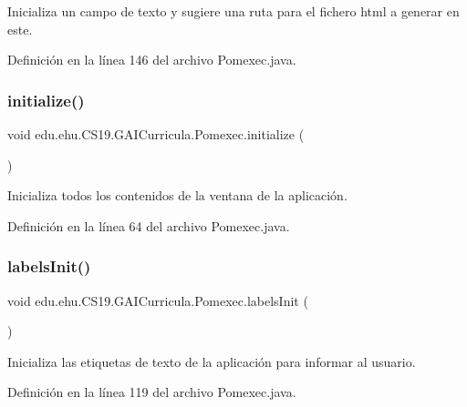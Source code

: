 Inicializa un campo de texto y sugiere una ruta para el fichero html a generar en este. 



Definición en la línea 146 del archivo Pomexec.\+java.

\mbox{\label{a00028_ab89003495509c2f11da18c9675828571}} 
\subsubsection{\texorpdfstring{initialize()}{initialize()}}
{\footnotesize\ttfamily void edu.\+ehu.\+C\+S19.\+G\+A\+I\+Curricula.\+Pomexec.\+initialize (\begin{DoxyParamCaption}{ }\end{DoxyParamCaption})\hspace{0.3cm}{\ttfamily [private]}}



Inicializa todos los contenidos de la ventana de la aplicación. 



Definición en la línea 64 del archivo Pomexec.\+java.

\mbox{\label{a00028_ab5c03aee261eda106376a3111cadaa0a}} 
\subsubsection{\texorpdfstring{labelsInit()}{labelsInit()}}
{\footnotesize\ttfamily void edu.\+ehu.\+C\+S19.\+G\+A\+I\+Curricula.\+Pomexec.\+labels\+Init (\begin{DoxyParamCaption}{ }\end{DoxyParamCaption})}



Inicializa las etiquetas de texto de la aplicación para informar al usuario. 



Definición en la línea 119 del archivo Pomexec.\+java.

\mbox{\label{a00028_a52ecabe81c9c3180cdccb3749b6553d6}} 
